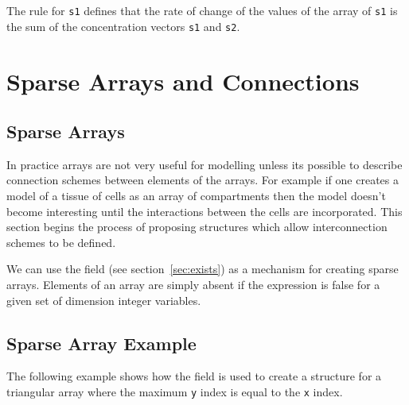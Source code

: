 \documentclass{cekarticle}
\begin{document}
The rule for \texttt{s1} defines that the rate of change of the
values of the array of \texttt{s1} is the sum of the concentration vectors
\texttt{s1} and \texttt{s2}.

\section{Sparse Arrays and Connections}
\label{sec:sparseandconnections}

\subsection{Sparse Arrays}
\label{sec:sparse}

In practice arrays are not very useful for modelling unless its
possible to describe connection schemes between elements of the
arrays.  For example if one creates a model of a tissue of cells
as an array of compartments then the model doesn't become
interesting until the interactions between the cells are
incorporated.  This section begins the process of proposing
structures which allow interconnection schemes to be defined.

We can use the  field (see section~\ref{sec:exists}) 
as a mechanism for creating sparse arrays.  Elements of an array
are simply absent if the  expression is false for a given
set of dimension integer variables.

\subsection{Sparse Array Example}
\label{sec:sparseeg}

The following example shows how the  field is used to create a structure for a triangular
array where the maximum \texttt{y} index is equal to the
\texttt{x} index.
\end{document}
